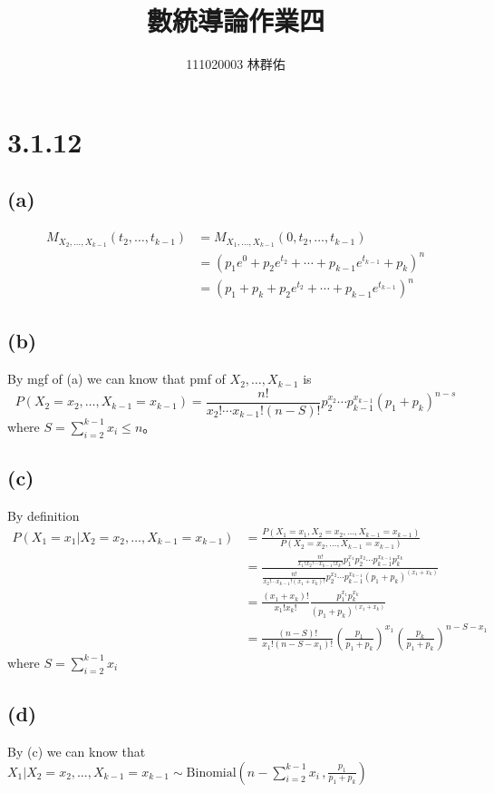 \documentclass{article}
\title{數統導論作業四}
\author{111020003 林群佑}
\date{}
\begin{document}
\maketitle
\section*{3.1.12}
\subsection*{(a)}
\begin{align*}
M_{X_2, \ldots, X_{k-1}}(t_2, \ldots, t_{k-1}) 
&= M_{X_1, \ldots, X_{k-1}}(0, t_2, \ldots, t_{k-1}) \\
&= (p_1 e^0 + p_2 e^{t_2} + \cdots + p_{k-1} e^{t_{k-1}} + p_k)^n \\
&= (p_1 + p_k + p_2 e^{t_2} + \cdots + p_{k-1} e^{t_{k-1}})^n
\end{align*}

\subsection*{(b)}

By mgf of (a) we can know that
pmf of $X_2, \ldots, X_{k-1}$ is
\[ 
P(X_2=x_2, \ldots, X_{k-1}=x_{k-1}) = 
\frac{n!}{x_2! \cdots x_{k-1}! (n - S)!} p_2^{x_2} \cdots p_{k-1}^{x_{k-1}} (p_1+p_k)^{n-s}
\]
where $S = \sum_{i=2}^{k-1} x_i \leq n$。

\subsection*{(c)}
By definition
\begin{align*}
P(X_1=x_1 | X_2=x_2, \ldots, X_{k-1}=x_{k-1})
&= \frac{P(X_1=x_1, X_2=x_2, \ldots, X_{k-1}=x_{k-1})}{P(X_2=x_2, \ldots, X_{k-1}=x_{k-1})}\\
&=\frac{\frac{n!}{x_1! x_2! \cdots x_{k-1}! x_k!} p_1^{x_1} p_2^{x_2} \cdots p_{k-1}^{x_{k-1}} p_k^{x_k}}
{\frac{n!}{x_2! \cdots x_{k-1}! (x_1+x_k)!} p_2^{x_2} \cdots p_{k-1}^{x_{k-1}} (p_1+p_k)^{(x_1+x_k)}}\\
&=\frac{(x_1 + x_k)!}{x_1! x_k!}\frac{p_1^{x_1}p_k^{x_k}}{(p_1+p_k)^{(x_1+x_k)}}\\
&=\frac{(n-S)!}{x_1! (n-S-x_1)!}\left(\frac{p_1}{p_1+p_k}\right)^{x_1}
\left(\frac{p_k}{p_1+p_k}\right)^{n-S-x_1}
\end{align*}
where \(S = \sum_{i=2}^{k-1} x_i\)
\subsection*{(d)}
By (c) we can know that \(X_1 | X_2=x_2, \ldots, X_{k-1}=x_{k-1}
\sim \text{Binomial}(n-\sum_{i=2}^{k-1}x_i \, , \frac{p_1}{p_1+p_k})\)
\end{document}
